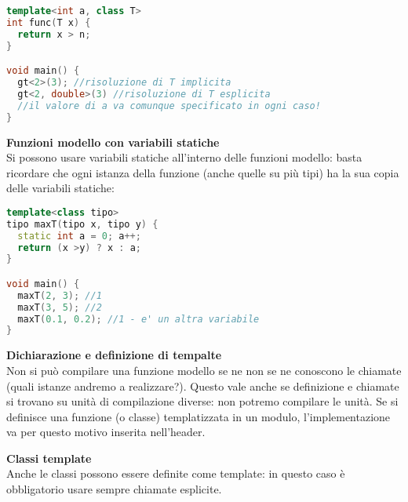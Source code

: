 \documentclass[a4paper,12pt]{article}
\begin{document}
\begin{lstlisting}[language=C++]
template<int a, class T>
int func(T x) {
  return x > n;
}

void main() {
  gt<2>(3); //risoluzione di T implicita
  gt<2, double>(3) //risoluzione di T esplicita
  //il valore di a va comunque specificato in ogni caso!
}
\end{lstlisting}
\par\smallskip
\textbf{Funzioni modello con variabili statiche} \\
Si possono usare variabili statiche all'interno delle funzioni modello: basta ricordare che ogni istanza della funzione (anche quelle su più tipi) ha la sua 
copia delle variabili statiche:
\begin{lstlisting}[language=C++]
template<class tipo>
tipo maxT(tipo x, tipo y) {
  static int a = 0; a++;
  return (x >y) ? x : a;
}

void main() {
  maxT(2, 3); //1
  maxT(3, 5); //2
  maxT(0.1, 0.2); //1 - e' un altra variabile
}
\end{lstlisting}
\par\smallskip
\textbf{Dichiarazione e definizione di tempalte} \\
Non si può compilare una funzione modello se ne non se ne conoscono le chiamate (quali istanze andremo a realizzare?). Questo
vale anche se definizione e chiamate si trovano su unità di compilazione diverse: non potremo compilare le unità. 
Se si definisce una funzione (o classe) templatizzata in un modulo, l'implementazione va per questo motivo inserita nell'header.
\par\smallskip
\textbf{Classi template} \\
Anche le classi possono essere definite come template: in questo caso è obbligatorio usare sempre chiamate esplicite.
\end{document}
